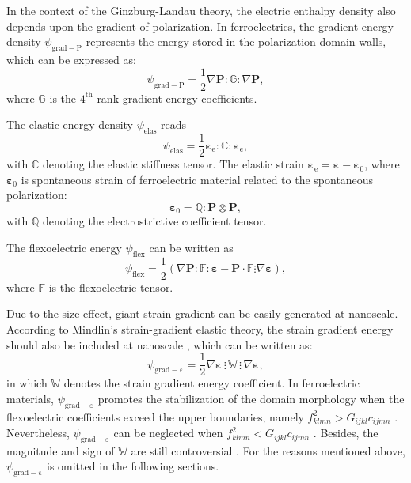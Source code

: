 \documentclass[times,fleqn,11pt]{elsarticle}
\begin{document}
In the context of the Ginzburg-Landau theory, the electric enthalpy density also depends upon the gradient of polarization. In ferroelectrics, the gradient energy density $\psi_\mathrm{grad-P}$ represents the energy stored in the polarization domain walls, which can be expressed as:
\begin{equation}\label{gradient_energy}
    \psi_\mathrm{grad-P}=\frac{1}{2}\nabla\mathbf{P}:\mathbb{G}:\nabla \mathbf{P},
\end{equation}
where $\mathbb{G}$ is the $4^\mathrm{th}$-rank gradient energy coefficients.

The elastic energy density $\psi_\mathrm{elas}$ reads
\begin{equation}\label{f_elas}
    \psi_\mathrm{elas}=\frac{1}{2}\mathbf{\varepsilon}_\mathrm{e}:\mathbb{C}:\mathbf{\varepsilon}_\mathrm{e},
\end{equation}
with $\mathbb{C}$ denoting the elastic stiffness tensor. The elastic strain $\mathbf{\varepsilon}_\mathrm{e}=\mathbf{\varepsilon}-\mathbf{\varepsilon}_0$, where $\mathbf{\varepsilon}_0$ is spontaneous strain of ferroelectric material related to the spontaneous polarization:
\begin{equation}\label{eq5}
    \mathbf{\varepsilon}_0=\mathbb{Q}:\mathbf{P}\otimes\mathbf{P},
\end{equation}
with $\mathbb{Q}$ denoting the electrostrictive coefficient tensor.

The flexoelectric energy $\psi_\mathrm{flex}$ can be written as 
\begin{equation}
    \psi_\mathrm{flex}=\frac{1}{2}(\nabla \mathbf{P}: \mathbb{F}: \mathbf{\varepsilon}-\mathbf{P}\cdot\mathbb{F}\vdots\nabla\mathbf{\varepsilon}),
\end{equation}
where $\mathbb{F}$ is the flexoelectric tensor. 

Due to the size effect, giant strain gradient can be easily generated at nanoscale. According to Mindlin's strain-gradient elastic theory, the strain gradient energy should also be included at nanoscale \cite{mindlin_first_1968}, which can be written as:
\begin{equation}
    \psi_\mathrm{grad-\varepsilon}=\frac{1}{2}\nabla\mathbf{\varepsilon}\,\vdots\,\mathbb{W}\,\vdots\,\nabla\mathbf{\varepsilon},
\end{equation}
in which $\mathbb{W}$ denotes the strain gradient energy coefficient. In ferroelectric materials, $\psi_\mathrm{grad-\varepsilon}$ promotes the stabilization of the domain morphology when the flexoelectric coefficients exceed the upper boundaries, namely $f_{klmn}^2>G_{ijkl}c_{ijmn}$ \cite{jiang_interrelationship_2016}. Nevertheless,  $\psi_\mathrm{grad-\varepsilon}$ can be neglected when $f_{klmn}^2<G_{ijkl}c_{ijmn}$ \cite{eliseev_spontaneous_2009,chen_utilizing_2015,xu_reduction_2017}. Besides, the magnitude and sign of $\mathbb{W}$ are still controversial \cite{eliseev_defect-driven_2018}. For the reasons mentioned above, $\psi_\mathrm{grad-\varepsilon}$ is omitted in the following sections.
\end{document}
